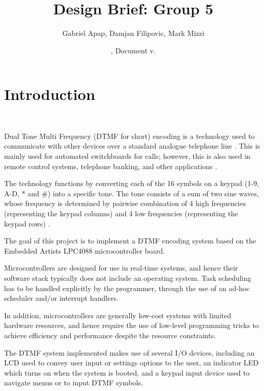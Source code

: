 \documentclass[11pt,a4paper,twocolumn]{scrartcl}
\title{Design Brief: Group 5}
\author{
   Gabriel Apap,
   Damjan Filipovic,
   Mark Mizzi
   }
\date{\svnMaxToday, Document v.\svnInfoMaxRevision}
\begin{document}
\maketitle


\section{Introduction}~\label{introduction}

   Dual Tone Multi Frequency (DTMF for short) encoding is a technology used to communicate with other devices over a standard analogue telephone line \cite{sl:an218}. This is mainly used for automated switchboards for calls; however, this is also used in remote control systems, telephone banking, and other applications \cite{sl:an218}.

   The technology functions by converting each of the 16 symbols on a keypad (1-9, A-D, * and \#) into a specific tone. The tone consists of a sum of two sine waves, whose frequency is determined by pairwise combination of 4 high frequencies (representing the keypad columns) and 4 low frequencies (representing the keypad rows) \cite{sl:an218}.

   The goal of this project is to implement a DTMF encoding system based on the Embedded Artists LPC4088 microcontroller board.

   Microcontrollers are designed for use in real-time systems, and hence their software stack typically does not include an operating system. Task scheduling has to be handled explicitly by the programmer, through the use of an ad-hoc scheduler and/or interrupt handlers.

   In addition, microcontrollers are generally low-cost systems with limited hardware resources, and hence require the use of low-level programming tricks to achieve efficiency and performance despite the resource constraints.
   
   The DTMF system implemented makes use of several I/O devices, including an LCD used to convey user input or settings options to the user,
   an indicator LED which turns on when the system is booted, and a keypad input device used to navigate menus or to input DTMF symbols.
\end{document}
